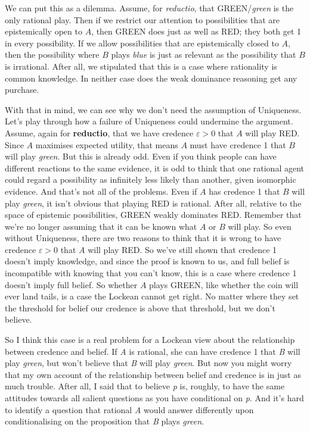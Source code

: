 \documentclass[
  10pt,
  letterpaper,
  DIV=11,
  numbers=noendperiod,
  twoside]{scrartcl}
\begin{document}
We can put this as a dilemma. Assume, for \emph{reductio}, that
GREEN/\emph{green} is the only rational play. Then if we restrict our
attention to possibilities that are epistemically open to \(A\), then
GREEN does just as well as RED; they both get 1 in every possibility. If
we allow possibilities that are epistemically closed to \(A\), then the
possibility where \(B\) plays \emph{blue} is just as relevant as the
possibility that \(B\) is irrational. After all, we stipulated that this
is a case where rationality is common knowledge. In neither case does
the weak dominance reasoning get any purchase.

With that in mind, we can see why we don't need the assumption of
Uniqueness. Let's play through how a failure of Uniqueness could
undermine the argument. Assume, again for \textbf{reductio}, that we
have credence \(\varepsilon > 0\) that \(A\) will play RED. Since \(A\)
maximises expected utility, that means \(A\) must have credence 1 that
\(B\) will play \emph{green}. But this is already odd. Even if you think
people can have different reactions to the same evidence, it is odd to
think that one rational agent could regard a possibility as infinitely
less likely than another, given isomorphic evidence. And that's not all
of the problems. Even if \(A\) has credence 1 that \(B\) will play
\emph{green}, it isn't obvious that playing RED is rational. After all,
relative to the space of epistemic possibilities, GREEN weakly dominates
RED. Remember that we're no longer assuming that it can be known what
\(A\) or \(B\) will play. So even without Uniqueness, there are two
reasons to think that it is wrong to have credence \(\varepsilon > 0\)
that \(A\) will play RED. So we've still shown that credence 1 doesn't
imply knowledge, and since the proof is known to us, and full belief is
incompatible with knowing that you can't know, this is a case where
credence 1 doesn't imply full belief. So whether \(A\) plays GREEN, like
whether the coin will ever land tails, is a case the Lockean cannot get
right. No matter where they set the threshold for belief our credence is
above that threshold, but we don't believe.

So I think this case is a real problem for a Lockean view about the
relationship between credence and belief. If \emph{A} is rational, she
can have credence 1 that \emph{B} will play \emph{green}, but won't
believe that \emph{B} will play \emph{green}. But now you might worry
that my own account of the relationship between belief and credence is
in just as much trouble. After all, I said that to believe \emph{p} is,
roughly, to have the same attitudes towards all salient questions as you
have conditional on \emph{p}. And it's hard to identify a question that
rational \emph{A} would answer differently upon conditionalising on the
proposition that \emph{B} plays \emph{green}.
\end{document}

